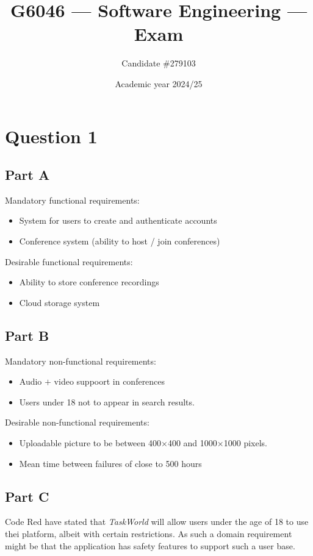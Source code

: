\documentclass[a4paper]{report}
\title{G6046 --- Software Engineering --- Exam}
\author{Candidate \#279103}
\date{Academic year 2024/25}
\begin{document}
\maketitle

\section{Question 1}


\subsection{Part A}

Mandatory functional requirements:
\begin{itemize}
    \item System for users to create and authenticate accounts
    \item Conference system (ability to host / join conferences)
\end{itemize}

Desirable functional requirements:
\begin{itemize}
    \item Ability to store conference recordings
    \item Cloud storage system
\end{itemize}


\subsection{Part B}
Mandatory non-functional requirements:
\begin{itemize}
    \item Audio $+$ video suppoort in conferences
    \item Users under 18 not to appear in search results.
\end{itemize}

Desirable non-functional requirements:
\begin{itemize}
    \item Uploadable picture to be between 400$\times$400 and 1000$\times$1000 pixels.
    \item Mean time between failures of close to 500 hours
\end{itemize}


\subsection{Part C}
Code Red have stated that \textit{TaskWorld} will allow users under the
age of 18 to use thei platform, albeit with certain restrictions. As such a domain
requirement might be that the application has safety features to support such a user base.
\end{document}
